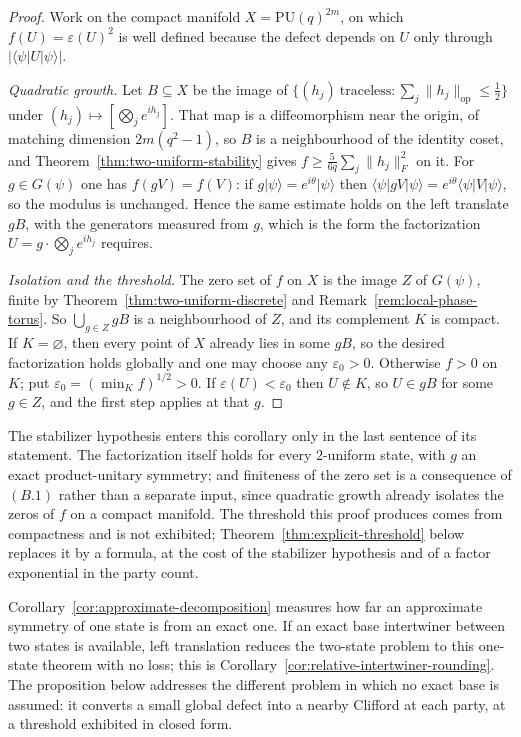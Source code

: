 \begin{proof}
Work on the compact manifold \(X=\mathrm{PU}(q)^{2m}\), on which
\(f(U)=\varepsilon(U)^2\) is well defined because the defect depends on
\(U\) only through \(\lvert\langle\psi\rvert U\lvert\psi\rangle\rvert\).

\emph{Quadratic growth.}  Let \(B\subseteq X\) be the image of
\(\{(h_j)\ \text{traceless}:\sum_j\lVert h_j\rVert_{\mathrm{op}}
\leq\frac12\}\) under \((h_j)\mapsto[\bigotimes_je^{ih_j}]\).  That map is
a diffeomorphism near the origin, of matching dimension
\(2m(q^2-1)\), so \(B\) is a neighbourhood of the identity coset, and
Theorem~\ref{thm:two-uniform-stability} gives
\(f\geq\frac5{6q}\sum_j\lVert h_j\rVert_F^2\) on it.  For \(g\in G(\psi)\)
one has \(f(gV)=f(V)\): if \(g\lvert\psi\rangle=e^{i\theta}\lvert\psi\rangle\)
then \(\langle\psi\rvert g V\lvert\psi\rangle
=e^{i\theta}\langle\psi\rvert V\lvert\psi\rangle\), so the modulus is
unchanged.  Hence the same estimate
holds on the left translate \(gB\), with the generators measured from \(g\),
which is the form the factorization \(U=g\cdot\bigotimes_je^{ih_j}\) requires.

\emph{Isolation and the threshold.}  The zero set of \(f\) on \(X\) is the
image \(Z\) of \(G(\psi)\), finite by
Theorem~\ref{thm:two-uniform-discrete} and
Remark~\ref{rem:local-phase-torus}.  So \(\bigcup_{g\in Z}gB\) is a
neighbourhood of \(Z\), and its complement \(K\) is compact.  If
\(K=\varnothing\), then every point of \(X\) already lies in some \(gB\),
so the desired factorization holds globally and one may choose any
\(\varepsilon_0>0\).  Otherwise \(f>0\) on
\(K\); put \(\varepsilon_0=(\min_Kf)^{1/2}>0\).  If
\(\varepsilon(U)<\varepsilon_0\) then \(U\notin K\), so \(U\in gB\) for
some \(g\in Z\), and the first step applies at that \(g\).
\end{proof}

The stabilizer hypothesis enters this corollary only in the last sentence
of its statement.  The factorization itself holds for every \(2\)-uniform
state, with \(g\) an exact product-unitary symmetry; and finiteness of the
zero set is a consequence of \((B.1)\) rather than a separate input, since
quadratic growth already isolates the zeros of \(f\) on a compact manifold.
The threshold this proof produces comes from compactness and is not
exhibited; Theorem~\ref{thm:explicit-threshold} below replaces it by a
formula, at the cost of the stabilizer hypothesis and of a factor
exponential in the party count.

Corollary~\ref{cor:approximate-decomposition} measures how far an
approximate symmetry of one state is from an exact one.  If an exact base
intertwiner between two states is available, left translation reduces the
two-state problem to this one-state theorem with no loss; this is
Corollary~\ref{cor:relative-intertwiner-rounding}.  The proposition below
addresses the different problem in which no exact base is assumed: it converts
a small global defect into a nearby Clifford at each party, at a threshold
exhibited in closed form.

